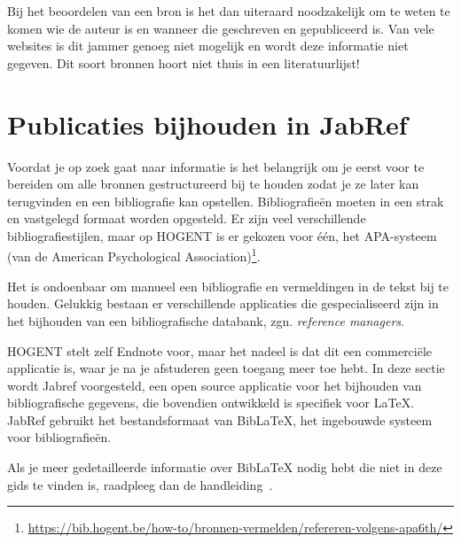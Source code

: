 Bij het beoordelen van een bron is het dan uiteraard noodzakelijk om te weten te komen wie de auteur is en wanneer die geschreven en gepubliceerd is. Van vele websites is dit jammer genoeg niet mogelijk en wordt deze informatie niet gegeven. Dit soort bronnen hoort niet thuis in een literatuurlijst!

\section{Publicaties bijhouden in JabRef}
\label{sec:publicaties_bijhouden_in_jabref}

Voordat je op zoek gaat naar informatie is het belangrijk om je eerst voor te bereiden om alle bronnen gestructureerd bij te houden zodat je ze later kan terugvinden en een bibliografie kan opstellen. Bibliografieën moeten in een strak en vastgelegd formaat worden opgesteld. Er zijn veel verschillende bibliografiestijlen, maar op HOGENT is er gekozen voor één, het APA-systeem (van de American Psychological Association)\footnote{\url{https://bib.hogent.be/how-to/bronnen-vermelden/refereren-volgens-apa6th/}}.

Het is ondoenbaar om manueel een bibliografie en vermeldingen in de tekst bij te houden.  Gelukkig bestaan er verschillende applicaties die gespecialiseerd zijn in het bijhouden van een bibliografische databank, zgn. \emph{reference managers}.

HOGENT stelt zelf Endnote voor, maar het nadeel is dat dit een commerciële applicatie is, waar je na je afstuderen geen toegang meer toe hebt. In deze sectie wordt Jabref voorgesteld, een open source applicatie voor het bijhouden van bibliografische gegevens, die bovendien ontwikkeld is specifiek voor {\LaTeX}. JabRef gebruikt het bestandsformaat van Bib{\LaTeX}, het ingebouwde systeem voor bibliografieën.

Als je meer gedetailleerde informatie over Bib{\LaTeX} nodig hebt die niet in deze gids te vinden is, raadpleeg dan de handleiding~\autocite{LehmanEtAl2016}.


